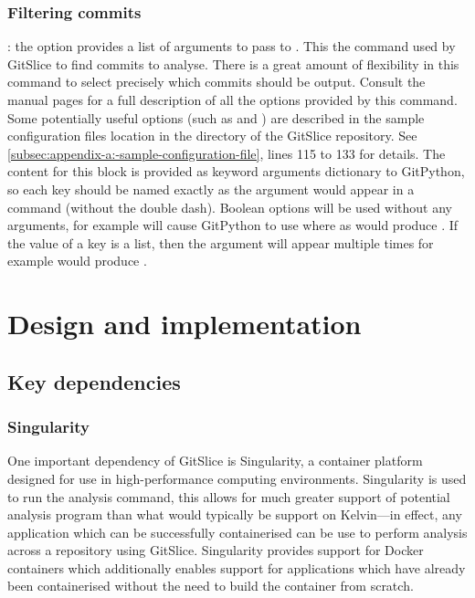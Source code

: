 \documentclass[11pt]{article}
\begin{document}
    \subsubsection{Filtering commits}

    : the  option provides a list of arguments to pass to .
    This the command used by GitSlice to find commits to analyse.
    There is a great amount of flexibility in this command to select precisely which commits should be output.
    Consult the manual pages for  a full description of all the options provided by this command.
    Some potentially useful options (such as  and ) are described in the sample configuration files location in the  directory of the GitSlice repository.
    See \autoref{subsec:appendix-a:-sample-configuration-file}, lines 115 to 133 for details.
    The content for this block is provided as keyword arguments dictionary to GitPython, so each key should be named exactly as the argument would appear in a  command (without the double dash).
    Boolean options will be used without any arguments, for example  will cause GitPython to use  where as  would produce .
    If the value of a key is a list, then the argument will appear multiple times for example  would produce .
    
    \section{Design and implementation}
    \label{sec:design-and-implementation}

    \subsection{Key dependencies}
    \label{subsec:key-dependencies}

    \subsubsection{Singularity}
    \label{subsubsec:singularity}

    One important dependency of GitSlice is Singularity, a container platform designed for use in high-performance computing environments.
    Singularity is used to run the analysis command, this allows for much greater support of potential analysis program than what would typically be support on Kelvin---in effect, any application which can be successfully containerised can be use to perform analysis across a repository using GitSlice.
    Singularity provides support for Docker containers which additionally enables support for applications which have already been containerised without the need to build the container from scratch.
\end{document}
